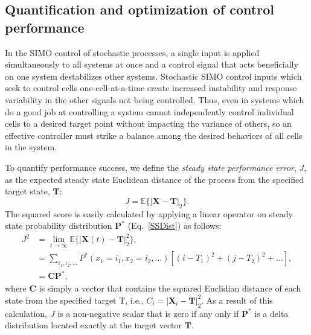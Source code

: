 \documentclass[12pt]{iopart}
\begin{document}
\michael[ok!]

\subsection{Quantification and optimization of control performance}\label{sec:Quantification}
In the SIMO control of stochastic processes, a single input is applied simultaneously to all systems at once and a control signal that acts beneficially on one system destabilizes other systems. Stochastic SIMO control inputs which seek to control cells one-cell-at-a-time create increased instability and response variability in the other signals not being controlled.
Thus, even in systems which do a good job at controlling a system cannot independently control individual cells to a desired target point without impacting the variance of others, so an effective controller must strike a balance among the desired behaviors of all cells in the system. 

To quantify performance success, we define the {\em steady state performance error}, $J$, as the expected steady state Euclidean distance of the process from the specified target state, $\mathbf{T}$:
 \begin{equation}
 J = \mathbb{E}\{|\mathbf{X}-\mathbf{T}|_2\}.
 \end{equation}
The squared score is easily calculated by applying a linear operator on steady state probability distribution $\mathbf{P}^*$ (Eq.\ \ref{SSDist}) as follows:
\begin{eqnarray}
J^2&= \lim_{t\rightarrow \infty}\mathbb{E}\{|\mathbf{X}(t)-\mathbf{T}|_2^2\}, \nonumber \\ 
&=\sum_{i_1,i_2,\ldots} P^*(x_1=i_1,x_2=i_2,\ldots) \left[(i- T_1)^2 + (j- T_2)^2 +\ldots\right],\nonumber  \\
&=\mathbf{C}\mathbf{P}^*,
\label{Euclid} 
\end{eqnarray}
where $\mathbf{C}$ is simply a vector that contains the squared Euclidian distance of each state from the specified target T, i.e., $C_i = |\mathbf{X}_i-\mathbf{T}|_2^2$. 
As a result of this calculation, $J$ is a non-negative scalar that is zero if any only if $\mathbf{P}^*$ is a delta distribution located exactly at the target vector $\mathbf{T}$.
\end{document}
